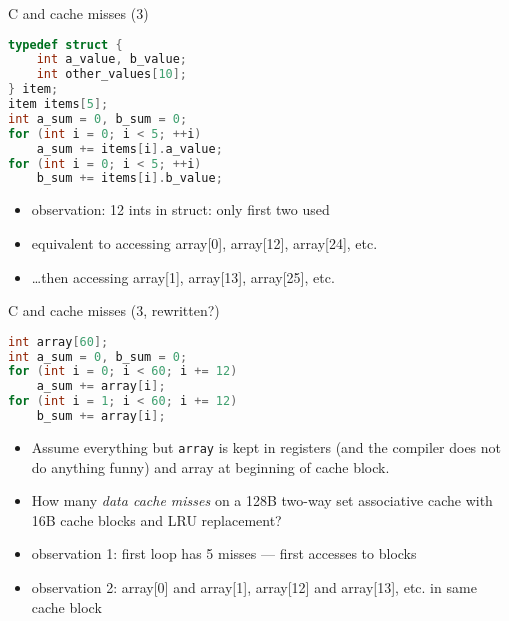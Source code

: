 \begin{frame}[fragile,label=arrayMissesSparse1Alt]{C and cache misses (3)}
\begin{lstlisting}[language=C,style=small]
typedef struct {
    int a_value, b_value;
    int other_values[10];
} item;
item items[5];
int a_sum = 0, b_sum = 0;
for (int i = 0; i < 5; ++i)
    a_sum += items[i].a_value;
for (int i = 0; i < 5; ++i)
    b_sum += items[i].b_value;
\end{lstlisting}
\begin{itemize}
    \item observation: 12 ints in struct: only first two used
    \item equivalent to accessing array[0], array[12], array[24], etc.
    \item \ldots then accessing array[1], array[13], array[25], etc.
\end{itemize}
\end{frame}


\begin{frame}[fragile,label=arrayMissesSparse1bAlt]{C and cache misses (3, rewritten?)}
\begin{lstlisting}[language=C,style=small]
int array[60];
int a_sum = 0, b_sum = 0;
for (int i = 0; i < 60; i += 12)
    a_sum += array[i];
for (int i = 1; i < 60; i += 12)
    b_sum += array[i];
\end{lstlisting}
    \begin{itemize}
        \item {\small
    Assume everything but {\tt array} is kept in registers (and the compiler does not do
    anything funny) and array at beginning of cache block.
        }
    \item
How many \textit{data cache misses} on a 128B two-way set associative cache with 16B cache blocks
and LRU replacement?
\item observation 1: first loop has 5 misses --- first accesses to blocks
\item observation 2: array[0] and array[1], array[12] and array[13], etc. in same cache block
    \end{itemize}
\end{frame}


